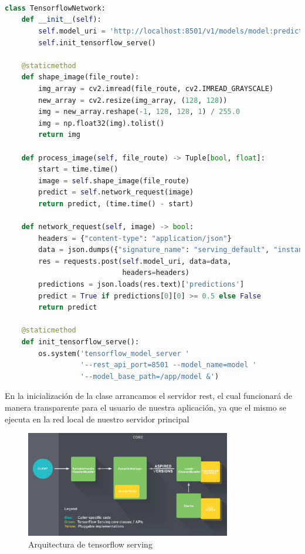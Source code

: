 \begin{lstlisting}[caption=Clase de Tensorflow de la aplicación del trabajo.,
  label=a_label,
  language=python]



class TensorflowNetwork:
    def __init__(self):
        self.model_uri = 'http://localhost:8501/v1/models/model:predict'
        self.init_tensorflow_serve()

    @staticmethod
    def shape_image(file_route):
        img_array = cv2.imread(file_route, cv2.IMREAD_GRAYSCALE)
        new_array = cv2.resize(img_array, (128, 128))
        img = new_array.reshape(-1, 128, 128, 1) / 255.0
        img = np.float32(img).tolist()
        return img

    def process_image(self, file_route) -> Tuple[bool, float]:
        start = time.time()
        image = self.shape_image(file_route)
        predict = self.network_request(image)
        return predict, (time.time() - start)

    def network_request(self, image) -> bool:
        headers = {"content-type": "application/json"}
        data = json.dumps({"signature_name": "serving_default", "instances": image})
        res = requests.post(self.model_uri, data=data,
                            headers=headers)
        predictions = json.loads(res.text)['predictions']
        predict = True if predictions[0][0] >= 0.5 else False
        return predict

    @staticmethod
    def init_tensorflow_serve():
        os.system('tensorflow_model_server '
                  '--rest_api_port=8501 --model_name=model '
                  '--model_base_path=/app/model &')
\end{lstlisting}
En la inicialización de la clase arrancamos el servidor rest, el cual funcionará de manera transparente para el usuario de nuestra aplicación, ya que el mismo se ejecuta en la red
local de nuestro servidor principal


\begin{figure}[h]
    \centering
    \includegraphics[width=0.8\textwidth]{images/chapter3/tf_serving_architecture.png}
    \caption{Arquitectura de tensorflow serving}
    \label{fig:Arquitectura de tensorflow serving}
\end{figure}

